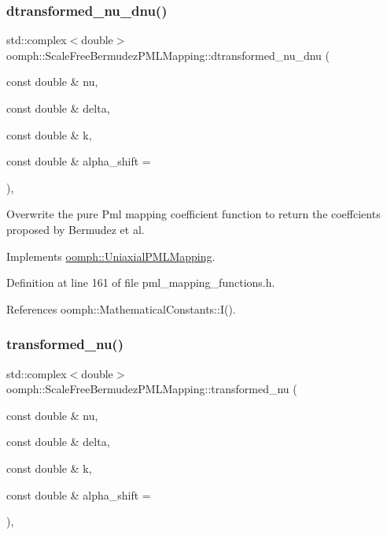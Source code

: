 \subsubsection{\texorpdfstring{dtransformed\+\_\+nu\+\_\+dnu()}{dtransformed\_nu\_dnu()}}
{\footnotesize\ttfamily std\+::complex$<$double$>$ oomph\+::\+Scale\+Free\+Bermudez\+P\+M\+L\+Mapping\+::dtransformed\+\_\+nu\+\_\+dnu (\begin{DoxyParamCaption}\item[{const double \&}]{nu,  }\item[{const double \&}]{delta,  }\item[{const double \&}]{k,  }\item[{const double \&}]{alpha\+\_\+shift = {} }\end{DoxyParamCaption})\hspace{0.3cm}{\ttfamily [inline]}, {\ttfamily [virtual]}}



Overwrite the pure Pml mapping coefficient function to return the coeffcients proposed by Bermudez et al. 



Implements \hyperlink{classoomph_1_1UniaxialPMLMapping_a2062b54207f13512fd3d9b901c882d44}{oomph\+::\+Uniaxial\+P\+M\+L\+Mapping}.



Definition at line 161 of file pml\+\_\+mapping\+\_\+functions.\+h.



References oomph\+::\+Mathematical\+Constants\+::\+I().

\mbox{\label{classoomph_1_1ScaleFreeBermudezPMLMapping_a65112b463d5b7d5728fb5325ea09791a}} 
\subsubsection{\texorpdfstring{transformed\+\_\+nu()}{transformed\_nu()}}
{\footnotesize\ttfamily std\+::complex$<$double$>$ oomph\+::\+Scale\+Free\+Bermudez\+P\+M\+L\+Mapping\+::transformed\+\_\+nu (\begin{DoxyParamCaption}\item[{const double \&}]{nu,  }\item[{const double \&}]{delta,  }\item[{const double \&}]{k,  }\item[{const double \&}]{alpha\+\_\+shift = {} }\end{DoxyParamCaption})\hspace{0.3cm}{\ttfamily [inline]}, {\ttfamily [virtual]}}



